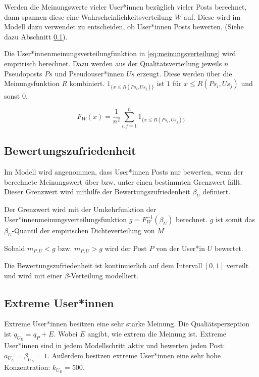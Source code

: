 Werden die Meinungswerte vieler User*innen bezüglich vieler Posts berechnet, dann spannen diese eine Wahrscheinlichkeitsverteilung $W$ auf. Diese wird im Modell dazu verwendet zu entscheiden, ob User*innen Posts bewerten. (Siehe dazu Abschnitt \ref{bewertungszufriedenheit}).

Die User*innenmeinungsverteilungfunktion in \ref{eq:meinungsverteilung} wird empririsch berechnet. Dazu werden aus der Qualitätsverteilung jeweils $n$ Pseudoposts $Ps$ und Pseudouser*innen $Us$ erzeugt. Diese werden über die Meinungsfunktion $R$ kombiniert. $1_{\{x \leq R(Ps_i,Us_j)\}}$ ist $1$ für $x \leq R(Ps_i,Us_j)$ und sonst $0$.

\begin{equation}
\label{eq:meinungsverteilung}
F_W(x) = \frac{1}{n^2}\sum_{i,j = 1}^{n} 1_{\{x \leq R(Ps_i,Us_j)\}}
\end{equation}


\subsection{Bewertungszufriedenheit}
\label{bewertungszufriedenheit}
Im Modell wird angenommen, dass User*innen Posts nur bewerten, wenn der berechnete Meinungswert über bzw. unter einen bestimmten Grenzwert fällt. Dieser Grenzwert wird mithilfe der Bewertungszufriedenheit $\beta_U$ definiert.

Der Grenzwert wird mit der Umkehrfunktion der User*innenmeinungsverteilungsfunktion $g = F_W^{-1}(\beta_U)$ berechnet.
$g$ ist somit das $\beta_U$-Quantil der empirischen Dichteverteilung von $M$


Sobald $m_{P,U} < g$ bzw. $m_{P,U} > g$ wird der Post $P$ von der User*in $U$ bewertet. 

Die Bewertungszufriedenheit ist kontinuierlich auf dem Intervall $[0,1]$ verteilt und wird mit einer $\beta$-Verteilung modelliert.

\subsection{Extreme User*innen}

Extreme User*innen besitzen eine sehr starke Meinung. Die Qualiätsperzeption ist $q_{U_E} = q_P + E$. Wobei $E$ angibt, wie extrem die Meinung ist. Extreme User*innen sind in jedem Modellschritt aktiv und bewerten jeden Post: $a_{U_E}= \beta_{U_E} = 1$. Außerdem besitzen extreme User*innen eine sehr hohe Konzentration:  $k_{U_E} = 500$.

